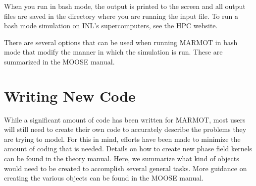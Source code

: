 \documentclass[letter,12pt,fleqn]{article}
\begin{document}
When you run in bash mode, the output is printed to the screen and all output files are saved in the directory where you are running the input file. To run a bash mode simulation on INL's supercomputers, see the HPC website.

There are several options that can be used when running MARMOT in bash mode that modify the manner in which the simulation is run. These are summarized in the MOOSE manual.  

\section{Writing New Code}
While a significant amount of code has been written for MARMOT, most users will still need to create their own code to accurately describe the problems they are trying to model. For this in mind, efforts have been made to minimize the amount of coding that is needed. Details on how to create new phase field kernels can be found in the theory manual. Here, we summarize what kind of objects would need to be created to accomplish several general tasks. More guidance on creating the various objects can be found in the MOOSE manual.
\end{document}
